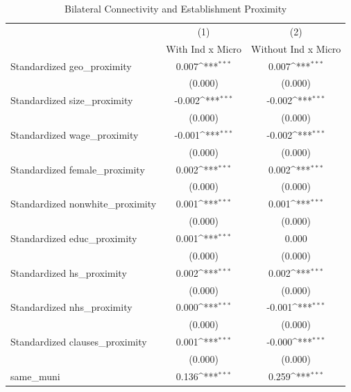 \begin{table}[htbp]\centering
\def\sym#1{\ifmmode^{#1}\else\(^{#1}\)\fi}
\caption{Bilateral Connectivity and Establishment Proximity}
\begin{tabular}{l*{2}{c}}
\hline\hline
                    &\multicolumn{1}{c}{(1)}&\multicolumn{1}{c}{(2)}\\
                    &\multicolumn{1}{c}{With Ind x Micro}&\multicolumn{1}{c}{Without Ind x Micro}\\
\hline
Standardized geo\_proximity&       0.007\sym{***}&       0.007\sym{***}\\
                    &     (0.000)         &     (0.000)         \\
[1em]
Standardized size\_proximity&      -0.002\sym{***}&      -0.002\sym{***}\\
                    &     (0.000)         &     (0.000)         \\
[1em]
Standardized wage\_proximity&      -0.001\sym{***}&      -0.002\sym{***}\\
                    &     (0.000)         &     (0.000)         \\
[1em]
Standardized female\_proximity&       0.002\sym{***}&       0.002\sym{***}\\
                    &     (0.000)         &     (0.000)         \\
[1em]
Standardized nonwhite\_proximity&       0.001\sym{***}&       0.001\sym{***}\\
                    &     (0.000)         &     (0.000)         \\
[1em]
Standardized educ\_proximity&       0.001\sym{***}&       0.000         \\
                    &     (0.000)         &     (0.000)         \\
[1em]
Standardized hs\_proximity&       0.002\sym{***}&       0.002\sym{***}\\
                    &     (0.000)         &     (0.000)         \\
[1em]
Standardized nhs\_proximity&       0.000\sym{***}&      -0.001\sym{***}\\
                    &     (0.000)         &     (0.000)         \\
[1em]
Standardized clauses\_proximity&       0.001\sym{***}&      -0.000\sym{***}\\
                    &     (0.000)         &     (0.000)         \\
[1em]
same\_muni           &       0.136\sym{***}&       0.259\sym{***}\\

\end{tabular}
\end{table}
